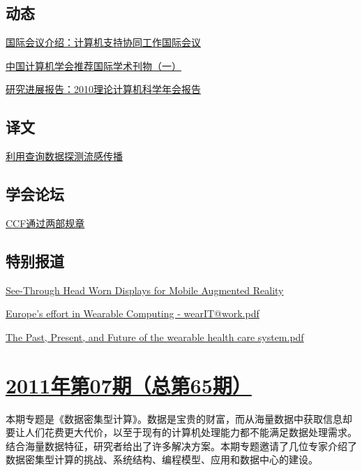 \documentclass[a4paper]{article}
\begin{document}
\subsection{动态}
\href{http://history.ccf.org.cn/resources/1190201776262/2011/08/16/13.pdf}{国际会议介绍：计算机支持协同工作国际会议}

\href{http://history.ccf.org.cn/resources/1190201776262/2011/08/16/15.pdf}{中国计算机学会推荐国际学术刊物（一）}

\href{http://history.ccf.org.cn/resources/1190201776262/2011/08/16/14.pdf}{研究进展报告：2010理论计算机科学年会报告}

\subsection{译文}
\href{http://history.ccf.org.cn/resources/1190201776262/2011/08/16/16.pdf}{利用查询数据探测流感传播}

\subsection{学会论坛}
\href{http://history.ccf.org.cn/resources/1190201776262/2011/08/16/17.pdf}{CCF通过两部规章}

\subsection{特别报道}
\href{http://history.ccf.org.cn/resources/1190201776262/2011/08/17/See-Through Head Worn Displays for Mobile Augmented Reality.pdf}{See-Through Head Worn Displays for Mobile Augmented Reality}

\href{http://history.ccf.org.cn/resources/1190201776262/2011/08/17/Europe's effort in Wearable Computing - wearIT@work.pdf}{Europe's effort in Wearable Computing - wearIT@work.pdf}

\href{http://history.ccf.org.cn/resources/1190201776262/2011/08/17/The Past, Present, and Future of the wearable health care system.pdf}{The Past, Present, and Future of the wearable health care system.pdf}


\section{\href{http://history.ccf.org.cn/sites/ccf/jsjtbbd.jsp?contentId=2621220707876}{\textbf{2011年第07期（总第65期）}}}
本期专题是《数据密集型计算》。数据是宝贵的财富，而从海量数据中获取信息却要让人们花费更大代价，以至于现有的计算机处理能力都不能满足数据处理需求。结合海量数据特征，研究者给出了许多解决方案。本期专题邀请了几位专家介绍了数据密集型计算的挑战、系统结构、编程模型、应用和数据中心的建设。
\end{document}
